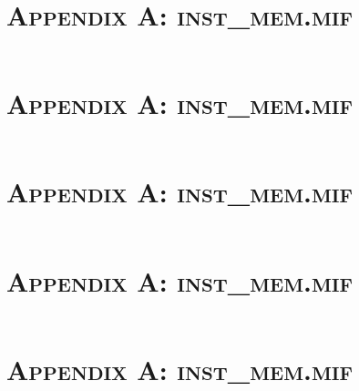 \documentclass[11pt]{report}
\begin{document}
\begin{spacing}{1.5}
\begin{lstlisting}
\end{lstlisting}

\chapter*{\scshape Appendix A: inst\_mem.mif}
\label{app:a}
\vspace{15px}
\begin{lstlisting}

\end{lstlisting}

\chapter*{\scshape Appendix A: inst\_mem.mif}
\label{app:a}
\vspace{15px}
\begin{lstlisting}

\end{lstlisting}

\chapter*{\scshape Appendix A: inst\_mem.mif}
\label{app:a}
\vspace{15px}
\begin{lstlisting}

\end{lstlisting}

\chapter*{\scshape Appendix A: inst\_mem.mif}
\label{app:a}
\vspace{15px}
\begin{lstlisting}

\end{lstlisting}

\chapter*{\scshape Appendix A: inst\_mem.mif}
\label{app:a}
\vspace{15px}
\begin{lstlisting}

\end{lstlisting}


\end{spacing}
\end{document}
